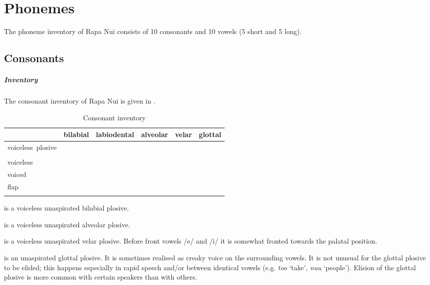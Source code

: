 \section{Phonemes}\label{sec:2.2}

The phoneme inventory of Rapa Nui consists of 10 consonants and 10 vowels (5 short and 5 long).

\subsection{Consonants}\label{sec:2.2.1}

\subparagraph{Inventory} The consonant inventory of Rapa Nui is given in .


\begin{table}
\begin{tabularx}{\textwidth}{L{30mm}Z{15mm}Z{18mm}Z{15mm}Z{11mm}Z{12mm}}
\lsptoprule
 & bilabial& labiodental& alveolar& velar& glottal\\
\midrule
voiceless~plosive & &  & & & \\
 & &  & & & \\
voiceless~ &  & & &  & \\
voiced~ &  & &  &  & \\
flap &  &  & &  & \\
\lspbottomrule
\end{tabularx}
\caption{Consonant inventory}
\label{tab:1}
\end{table}

 is a voiceless unaspirated bilabial plosive.

 is a voiceless unaspirated alveolar plosive.

 is a voiceless unaspirated velar plosive. Before front vowels /e/ and /i/ it is somewhat fronted towards the palatal position.

 is an unaspirated glottal plosive. It is sometimes realised as creaky voice on the surrounding vowels. It is not unusual for the glottal plosive to be elided; this happens especially in rapid speech and/or between identical vowels (e.g. \textit{to{\ꞌ}o} ‘take’, \textit{nu{\ꞌ}u} ‘people’). Elision of the glottal plosive is more common with certain speakers than with others. 


